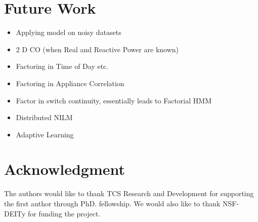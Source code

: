 \documentclass[conference]{IEEEtran}
\begin{document}
\section{Future Work}
\begin{itemize}

\item Applying model on noisy datasets
\item 2 D CO (when Real and Reactive Power are known)
\item Factoring in Time of Day etc.
\item Factoring in Appliance Correlation
\item Factor in switch continuity, essentially leads to Factorial HMM
\item Distributed NILM
\item Adaptive Learning
\end{itemize}

\section*{Acknowledgment}
The authors would like to thank TCS Research and Development for supporting the first author through PhD. fellowship. We would also like to thank NSF- DEITy for funding the project.


\end{document}
